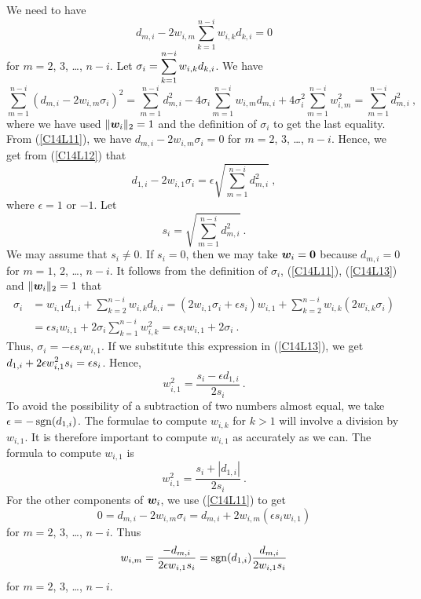 We need to have
\begin{equation}\label{C14L11}
d_{m,i} - 2 w_{i,m} \sum_{k=1}^{n-i} w_{i,k}d_{k,i} = 0
\end{equation}
for $m=2$, $3$, \ldots, $n-i$.  Let
$\displaystyle \sigma_i = \sum_{k=1}^{n-i} w_{i,k}d_{k,i}$.
We have
\begin{equation} \label{C14L12}
\sum_{m=1}^{n-i} \left( d_{m,i} -2 w_{i,m} \sigma_i \right)^2 =
\sum_{m=1}^{n-i} d_{m,i}^2 - 4\sigma_i \sum_{m=1}^{n-i} w_{i,m} d_{m,i}
+4 \sigma_i^2 \sum_{m=1}^{n-i} w_{i,m}^2
= \sum_{m=1}^{n-i} d_{m,i}^2 \ ,
\end{equation}
where we have used $\|\bm{w}_i\|_2=1$ and the definition of
$\sigma_i$ to get the last equality.  From (\ref{C14L11}), we have
$d_{m,i} -2 w_{i,m} \sigma_i = 0$ for $m=2$, $3$, \ldots, $n-i$.
Hence, we get from (\ref{C14L12}) that
\begin{equation} \label{C14L13}
d_{1,i} -2 w_{i,1} \sigma_i = \epsilon \sqrt{\sum_{m=1}^{n-i} d_{m,i}^2} \ ,
\end{equation}
where $\epsilon =1$ or $-1$.  Let
\begin{equation}\label{C14L14}
s_i = \sqrt{\sum_{m=1}^{n-i} d_{m,i}^2} \  .
\end{equation}
We may assume that $s_i \neq 0$.  If $s_i=0$, then we may take
$\bm{w}_i=\bm{0}$ because $d_{m,i}=0$ for $m=1$, $2$, \ldots, $n-i$.
It follows from the definition of $\sigma_i$, (\ref{C14L11}),
(\ref{C14L13}) and $\|\bm{w}_i\|_2=1$ that
\begin{align*}
\sigma_i &= w_{i,1}d_{1,i} + \sum_{k=2}^{n-i} w_{i,k}d_{k,i} =
\left( 2 w_{i,1} \sigma_i + \epsilon s_i\right) w_{i,1}
+ \sum_{k=2}^{n-i} w_{i,k} \left( 2 w_{i,k} \sigma_i \right) \\
&= \epsilon s_i w_{i,1} + 2 \sigma_i \sum_{k=1}^{n-i} w_{i,k}^2
= \epsilon s_i w_{i,1} + 2 \sigma_i \ .
\end{align*}
Thus, $\sigma_i = -\epsilon s_i w_{i,1}$.  If we substitute this
expression in (\ref{C14L13}), we get
$\displaystyle d_{1,i} + 2 \epsilon w_{i,1}^2 s_i = \epsilon s_i$.  Hence,
\begin{equation} \label{C14L15}
w_{i,1}^2 = \frac{s_i - \epsilon d_{1,i}}{2s_i} \ .
\end{equation}
To avoid the possibility of a subtraction of two numbers almost equal, we
take $\epsilon = - \operatorname{sgn}(d_{1,i})$.  The formulae to compute $w_{i,k}$
for $k>1$ will involve a division by $w_{i,1}$.  It is therefore
important to compute $w_{i,1}$ as accurately as we can.  The formula
to compute $w_{i,1}$ is
\begin{equation} \label{C14L16}
w_{i,1}^2 = \frac{s_i + \left| d_{1,i} \right|}{2s_i} \ .
\end{equation}
For the other components of $\bm{w}_i$, we use (\ref{C14L11}) to get
\[
0 = d_{m,i} - 2 w_{i,m} \sigma_i = d_{m,i} + 2 w_{i,m}
\left( \epsilon s_i w_{i,1} \right)
\]
for  $m=2$, $3$, \ldots, $n-i$.  Thus
\begin{equation} \label{C14L17}
w_{i,m} = \frac{-d_{m,i}}{2 \epsilon w_{i,1} s_i}
= \operatorname{sgn}(d_{1,i}) \frac{d_{m,i}}{2 w_{i,1} s_i}
\end{equation}
for $m=2$, $3$, \ldots, $n-i$.

